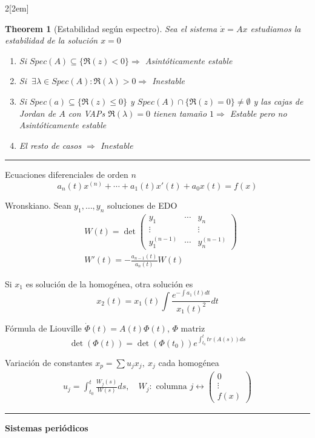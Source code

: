 \documentclass{myclass}
\newtheorem*{theorem}{Theorem}
\begin{document}
\begin{multicols}{2}[\columnsep2em]
\begin{theorem}[Estabilidad según espectro] Sea el sistema $\dot{x}=Ax$ estudiamos la estabilidad de la solución $x=0$
  \begin{enumerate}[topsep=-6pt, itemsep=0pt] 
    \item Si $Spec(A)\subseteq \{\Re(z)<0\} \Rightarrow $ Asintóticamente estable
    \item Si $\ \exists \lambda\in Spec(A): \Re(\lambda)>0 \Rightarrow $ Inestable
	\item Si $Spec(a)\subseteq \{\Re (z)\le 0\}$ y $Spec(A)\cap \{\Re(z)=0\}\neq \emptyset$ y las cajas de Jordan de $A$ con VAPs $\Re(\lambda)=0$ tienen tamaño $1 \Rightarrow $ Estable pero no Asintóticamente estable
	\item El resto de casos $\Rightarrow$ Inestable
  \end{enumerate}
\end{theorem}
\hrule
Ecuaciones diferenciales de orden $n$
 \[
a_n(t)x^{(n)} + \cdots + a_1(t)x'(t) + a_0x(t) = f(x)
\] 

Wronskiano. Sean $y_1, \ldots , y_n$ soluciones de EDO
\begin{align*}
  & W(t) = \det \begin{pmatrix} y_1 & \cdots & y_n \\ \vdots & & \vdots \\ y^{(n-1)}_1 & \cdots & y^{(n-1)}_n  \end{pmatrix}  \\
  & W'(t) = - \frac{a_{n-1}(t)}{a_{n}(t)}W(t)
\end{align*}

Si $x_1$ es solución de la homogénea, otra solución es
 \[
x_2(t) =  x_1(t) \int \frac{e^{-\int a_1(t)dt}}{x_1(t)^2}dt
\] 

Fórmula de Liouville $\dot{\Phi}(t) = A(t)\Phi(t)$, $\Phi$ matriz
\[
\det (\Phi(t)) = \det(\Phi(t_0))e^{\int _{t_0}^t tr(A(s))ds}
\]

Variación de constantes $x_p = \sum u_jx_j, \ x_j$ cada homogénea
\begin{align*}
  u_j = \int_{t_0}^t \frac{W_j(s)}{W(s)}ds, \quad W_j: \text{ columna } j \leftrightarrow \begin{pmatrix} 0 \\ \vdots \\ f(x) \end{pmatrix}  
\end{align*}

\hrule

\textbf{Sistemas periódicos}


\end{multicols}
\end{document}
